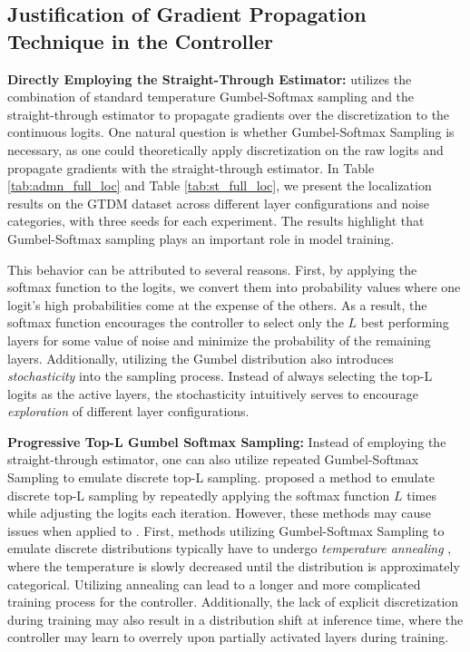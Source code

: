 \subsection{Justification of Gradient Propagation Technique in the Controller}
\label{subsec:grad_justify}
\textbf{Directly Employing the Straight-Through Estimator:}
\name utilizes the combination of standard temperature Gumbel-Softmax sampling and the straight-through estimator to propagate gradients over the discretization to the continuous logits. One natural question is whether Gumbel-Softmax Sampling is necessary, as one could theoretically apply discretization on the raw logits and propagate gradients with the straight-through estimator. In Table \ref{tab:admn_full_loc} and Table \ref{tab:st_full_loc}, we present the localization results on the GTDM dataset across different layer configurations and noise categories, with three seeds for each experiment. The results highlight that Gumbel-Softmax sampling plays an important role in model training.

This behavior can be attributed to several reasons. First, by applying the softmax function to the logits, we convert them into probability values where one logit's high probabilities come at the expense of the others. As a result, the softmax function encourages the controller to select only the $L$ best performing layers for some value of noise and minimize the probability of the remaining layers. Additionally, utilizing the Gumbel distribution also introduces \emph{stochasticity} into the sampling process. Instead of always selecting the top-L logits as the active layers, the stochasticity intuitively serves to encourage \emph{exploration} of different layer configurations. 


\textbf{Progressive Top-L Gumbel Softmax Sampling:} 
Instead of employing the straight-through estimator, one can also utilize repeated Gumbel-Softmax Sampling to emulate discrete top-L sampling. \cite{xie2019reparameterizable} proposed a method to emulate discrete top-L sampling by repeatedly applying the softmax function $L$ times while adjusting the logits each iteration. However, these methods may cause issues when applied to \name. First, methods utilizing Gumbel-Softmax Sampling to emulate discrete distributions typically have to undergo \emph{temperature annealing} \cite{maddison2016gumbel}, where the temperature is slowly decreased until the distribution is approximately categorical. Utilizing annealing can lead to a longer and more complicated training process for the controller. Additionally, the lack of explicit discretization during training may also result in a distribution shift at inference time, where the controller may learn to overrely upon partially activated layers during training. 


